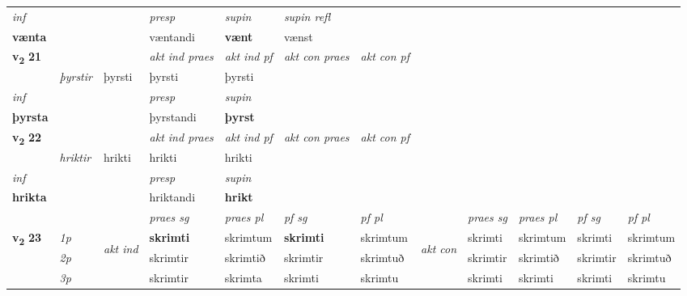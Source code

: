 \begin{longtable}[l]{X>{\footnotesize\itshape}llXXXXlXXXX}
\cmidrule{4-7}
   {\textit{inf}} & &     & \textit{presp} & \textit{supin} & \textit{supin refl}  \\*
  {\textbf{vænta}} & &     & væntandi &  \textbf{vænt} & vænst  \\*

\midrule

\multirow{2}{*}{{{\textbf{v{\textsubscript{2}}} \Large{\textbf{21}}}}}  &&&  \textit{akt ind praes} & \textit{akt ind pf} & \textit{akt con praes} & \textit{akt con pf} \\*
\multicolumn{3}{r}{\textit{e-n}} & þyrstir & þyrsti & þyrsti & þyrsti \\*

\cmidrule{4-7}
   {\textit{inf}} & &     & \textit{presp} & \textit{supin}   \\*
  {\textbf{þyrsta}} & &     & þyrstandi &  \textbf{þyrst}   \\*

\midrule

\multirow{2}{*}{{{\textbf{v{\textsubscript{2}}} \Large{\textbf{22}}}}}  &&&  \textit{akt ind praes} & \textit{akt ind pf} & \textit{akt con praes} & \textit{akt con pf} \\*
\multicolumn{3}{r}{\textit{það}} & hriktir & hrikti & hrikti & hrikti \\*

\cmidrule{4-7}
   {\textit{inf}} & &     & \textit{presp} & \textit{supin}   \\*
  {\textbf{hrikta}} & &     & hriktandi &  \textbf{hrikt}   \\*

\midrule

 & &   & \textit{praes sg}  & \textit{praes pl}    & \textit{ pf sg} & \textit{pf pl} & & \textit{praes sg}  & \textit{praes pl}    & \textit{pf sg} & \textit{pf pl }  \\ \cmidrule{4-7} \cmidrule{9-12}
 \multirow{2}{*}{{{\textbf{v{\textsubscript{2}}} \Large{\textbf{23}}}}}  & 1p & \multirow{3}{*}{\begin{turn}{90}\textit{akt ind}\end{turn}} & \textbf{skrimti} & skrimtum & \textbf{skrimti} & skrimtum & \multirow{3}{*}{\begin{turn}{90}\textit{akt con}\end{turn}} &skrimti & skrimtum & skrimti & skrimtum\\*
 & 2p &  &  skrimtir  & skrimtið & skrimtir & skrimtuð & & skrimtir & skrimtið & skrimtir & skrimtuð \\*
 & 3p &  & skrimtir & skrimta & skrimti & skrimtu & & skrimti & skrimti& skrimti & skrimtu \\*
\cmidrule{4-7} \cmidrule{9-12}


\end{longtable}
